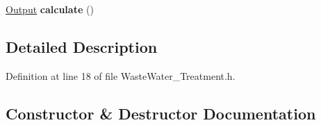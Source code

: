 \begin{DoxyCompactItemize}
\item 
\mbox{\label{class_waste_water___treatment_a11dd557c66157768516cb38a734533d2}} 
\hyperlink{struct_waste_water___treatment_1_1_output}{Output} {\bfseries calculate} ()
\end{DoxyCompactItemize}


\subsection{Detailed Description}


Definition at line 18 of file Waste\+Water\+\_\+\+Treatment.\+h.



\subsection{Constructor \& Destructor Documentation}
\mbox{\label{class_waste_water___treatment_aec57a97589b18d14aecd786271b8b5be}} 
